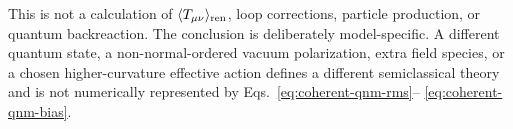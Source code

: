 This is not a calculation of $\langle T_{\mu\nu}\rangle_{\rm ren}$, loop
corrections, particle production, or quantum backreaction.  The conclusion is
deliberately model-specific.  A different quantum state,
a non-normal-ordered vacuum polarization, extra field species, or a chosen
higher-curvature effective action defines a different semiclassical theory
and is not numerically represented by Eqs.~\eqref{eq:coherent-qnm-rms}--
\eqref{eq:coherent-qnm-bias}.
